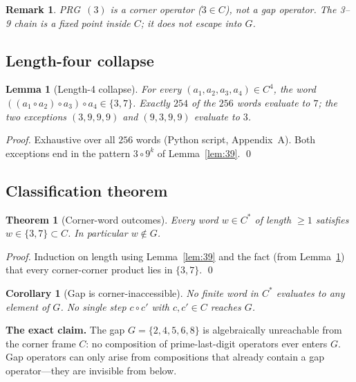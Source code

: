 \documentclass[11pt]{article}
\newtheorem{theorem}{Theorem}
\newtheorem{lemma}{Lemma}
\newtheorem{corollary}{Corollary}
\newtheorem{remark}{Remark}
\begin{document}
\begin{remark}
PRG~$(3)$ is a \emph{corner} operator ($3\in C$), not a gap operator.
The 3--9 chain is a fixed point \emph{inside} $C$; it does not
escape into $G$.
\end{remark}

\subsection{Length-four collapse}

\begin{lemma}[Length-4 collapse]\label{lem:len4}
For every $(a_1,a_2,a_3,a_4)\in C^4$, the word
$((a_1\circ a_2)\circ a_3)\circ a_4\in\{3,7\}$.
Exactly $254$ of the $256$ words evaluate to $7$; the two
exceptions $(3,9,9,9)$ and $(9,3,9,9)$ evaluate to $3$.
\end{lemma}

\begin{proof}
Exhaustive over all $256$ words (Python script, Appendix~A).
Both exceptions end in the pattern $3\circ9^k$ of Lemma~\ref{lem:39}. \qed
\end{proof}

\subsection{Classification theorem}

\begin{theorem}[Corner-word outcomes]\label{thm:classification}
Every word $w\in C^*$ of length $\ge1$ satisfies $w\in\{3,7\}\subset C$.
In particular $w\notin G$.
\end{theorem}

\begin{proof}
Induction on length using Lemma~\ref{lem:39} and the fact
(from Lemma~\ref{lem:len4}) that every corner-corner product
lies in $\{3,7\}$. \qed
\end{proof}

\begin{corollary}[Gap is corner-inaccessible]\label{cor:gap}
No finite word in $C^*$ evaluates to any element of $G$.
No single step $c\circ c'$ with $c,c'\in C$ reaches $G$.
\end{corollary}

\begin{tcolorbox}[colback=gray!8,colframe=black]
\textbf{The exact claim.}
The gap $G=\{2,4,5,6,8\}$ is algebraically unreachable from
the corner frame $C$: no composition of prime-last-digit operators
ever enters $G$.
Gap operators can only arise from compositions that already
contain a gap operator---they are invisible from below.
\end{tcolorbox}
\end{document}
